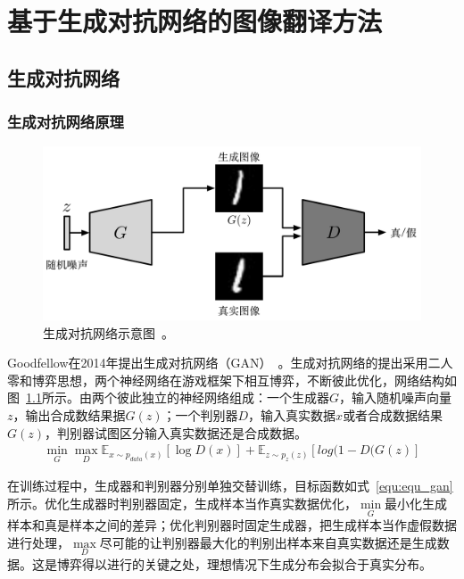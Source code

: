 \chapter{基于生成对抗网络的图像翻译方法}
\section{生成对抗网络}
\subsection{生成对抗网络原理}
\begin{figure}[ht]
    \centering
	\includegraphics[width=\textwidth]{figures/gan.pdf}
	\caption{生成对抗网络示意图~\cite{goodfellow2014generative}。}
	\label{fig:pic_gan}
\end{figure}

Goodfellow在2014年提出生成对抗网络（GAN）~\cite{goodfellow2014generative}。生成对抗网络的提出采用二人零和博弈思想，两个神经网络在游戏框架下相互博弈，不断彼此优化，网络结构如图~\ref{fig:pic_gan}所示。由两个彼此独立的神经网络组成：一个生成器$G$，输入随机噪声向量$z$，输出合成数结果据$G(z)$；一个判别器$D$，输入真实数据$x$或者合成数据结果$G(z)$，判别器试图区分输入真实数据还是合成数据。
\begin{equation}
\begin{split}
\mathop{min} \limits_{G} \mathop{max} \limits_{D} \mathbb{E}_{x \sim p_{data}(x)}[\log D(x)] + \mathbb{E}_{z \sim p_{z}(z)}[log(1-D(G(z)]
\end{split}
\label{equ:equ_gan}
\end{equation}

在训练过程中，生成器和判别器分别单独交替训练，目标函数如式~\ref{equ:equ_gan}所示。优化生成器时判别器固定，生成样本当作真实数据优化，$\min \limits_{G}$最小化生成样本和真是样本之间的差异；优化判别器时固定生成器，把生成样本当作虚假数据进行处理，$\max \limits_{D}$尽可能的让判别器最大化的判别出样本来自真实数据还是生成数据。这是博弈得以进行的关键之处，理想情况下生成分布会拟合于真实分布。

